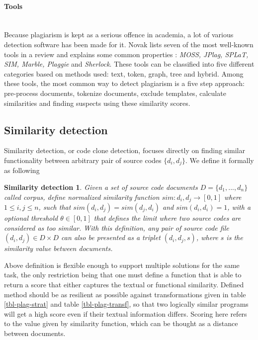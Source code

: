 \paragraph{Tools}\mbox{}\\
Because plagiarism is kept as a serious offence in academia, a lot of various detection software has been made for it. Novak lists seven of the most well-known tools in a review and explains some common properties \cite{RSCAD2016}: \emph{MOSS, JPlag, SPLaT, SIM, Marble, Plaggie} and \emph{Sherlock}. These tools can be classified into five different categories based on methods used: text, token, graph, tree and hybrid. Among these tools, the most common way to detect plagiarism is a five step approach: pre-process documents, tokenize documents, exclude templates, calculate similarities and finding suspects using these similarity scores.

\newpage

\subsection{Similarity detection} \label{chap-sd}

Similarity detection, or code clone detection, focuses directly on finding similar functionality between arbitrary pair of source codes $\{d_i, d_j\}$. We define it formally as following

\newtheorem*{smd1}{Similarity detection}

\begin{smd1}
Given a set of source code documents $D = \{d_1,...,d_n\}$ called corpus, define normalized similarity function $sim: d_i, d_j \rightarrow [0, 1]$ where $1 \leq i, j \leq n$, such that $sim(d_i, d_j) = sim(d_j, d_i)$ and $sim(d_i, d_i) = 1$, with a optional threshold $\theta \in [0, 1]$ that defines the limit where two source codes are considered as too similar. With this definition, any pair of source code file $(d_i, d_j) \in D \times D$ can also be presented as a triplet $(d_i, d_j, s)$, where $s$ is the similarity value between documents. 
\end{smd1}

\noindent
Above definition is flexible enough to support multiple solutions for the same task, the only restriction being that one must define a function that is able to return a score that either captures the textual or functional similarity. Defined method should be as resilient as possible against transformations given in table \ref{tbl-plag-strat} and table \ref{tbl-plag-transf}, so that two logically similar programs will get a high score even if their textual information differs. Scoring here refers to the value given by similarity function, which can be thought as a distance between documents.

